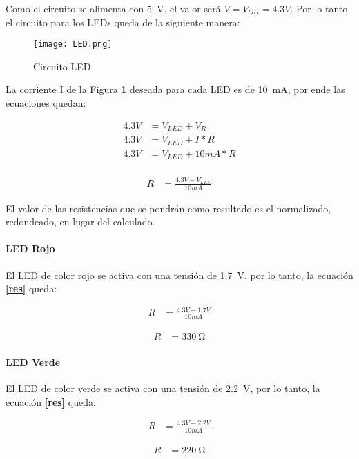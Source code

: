 \documentclass[12pt,a4paper]{article}
\begin{document}
	Como el circuito se alimenta con \SI{5}{\V}, el valor será $V = V_{OH} = 4.3 V$. Por lo tanto el circuito para los LEDs queda de la siguiente manera:
	
	\begin{figure}[h]
	\texttt{[image: LED.png]}
	\centering
	\caption{Circuito LED}
	\label{fig:leds}
	\end{figure}		
	
	\newpage
	La corriente I de la Figura \textbf{\ref{fig:leds}} deseada para cada LED es de \SI{10}{\mA}, por ende las ecuaciones quedan:
	
	\begin{align*}
	4.3 V &= V_{LED} + V_{R} \\
	4.3 V &= V_{LED} + I * R \\
	4.3 V &= V_{LED} + 10 mA * R \\
	\end{align*} 
	 
	\begin{align} \label{res}
	R &= \frac{4.3 V - V_{LED}}{10 mA}  
	\end{align}
	
	El valor de las resistencias que se pondrán como resultado es el normalizado, redondeado, en lugar del calculado.
	
	\paragraph{LED Rojo}
	El LED de color rojo se activa con una tensión de \SI{1.7}{\V}, por lo tanto, la ecuación \textbf{\ref{res}} queda:
	
	\begin{align*}
	R &= \frac{4.3 V - 1.7 V}{10 mA}  
	\end{align*}
		
	\begin{align}
	R &=  \SI{330}{\ohm}
	\end{align}	
	
	\paragraph{LED Verde}
	El LED de color verde se activa con una tensión de \SI{2.2}{\V}, por lo tanto, la ecuación \textbf{\ref{res}} queda:
	
	\begin{align*}
	R &= \frac{4.3 V - 2.2 V}{10 mA}  
	\end{align*}
	
	\begin{align}
	R &=  \SI{220}{\ohm}
	\end{align}	
	
\end{document}
